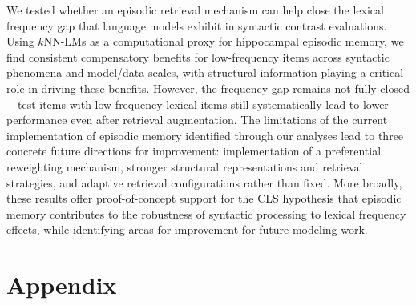 We tested whether an episodic retrieval mechanism can help close the lexical frequency gap that language models exhibit in syntactic contrast evaluations. Using $k$NN-LMs as a computational proxy for hippocampal episodic memory, we find consistent compensatory benefits for low-frequency items across syntactic phenomena and model/data scales, with structural information playing a critical role in driving these benefits. However, the frequency gap remains not fully closed---test items with low frequency lexical items still systematically lead to lower performance even after retrieval augmentation. The limitations of the current implementation of episodic memory identified through our analyses lead to three concrete future directions for improvement: implementation of a preferential reweighting mechanism, stronger structural representations and retrieval strategies, and adaptive retrieval configurations rather than fixed. More broadly, these results offer proof-of-concept support for the CLS hypothesis that episodic memory contributes to the robustness of syntactic processing to lexical frequency effects, while identifying areas for improvement for future modeling work. %





\section{Appendix}


